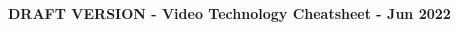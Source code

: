 \documentclass[10pt,a4paper,landscape]{article}
\begin{document}
\raggedright
\footnotesize

\begin{center}
     \Large{\textbf{DRAFT VERSION - Video Technology Cheatsheet - Jun 2022}} \\
\end{center}
\begin{multicols}{4}
\setlength{\premulticols}{1pt}
\setlength{\postmulticols}{1pt}
\setlength{\multicolsep}{1pt}
\setlength{\columnsep}{2pt}






\end{multicols}
\end{document}
